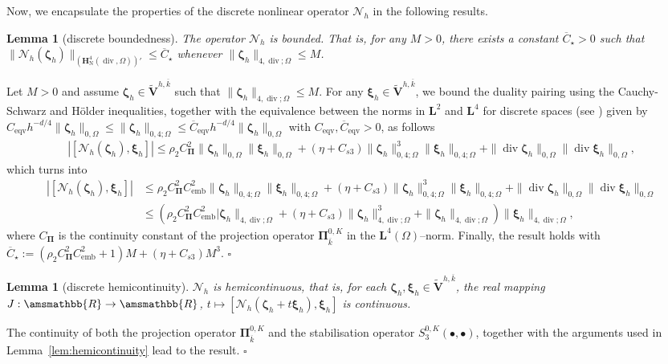 \documentclass[fleqn,a4paper]{cas-sc}
\newcommand\vdiv{\mathop{\mathrm{div}}\nolimits}
\newcommand{\bbR}{\amsmathbb{R}}
\newcommand{\bxi}{\boldsymbol{\xi}}
\newcommand{\bzeta}{\boldsymbol{\zeta}}
\newcommand{\bPi}{\boldsymbol{\Pi}}
\newcommand{\0}{\boldsymbol{0}}
\newcommand\cN{\mathcal{N}}
\newcommand\bV{\mathbf{V}}
\newcommand\bH{\mathbf{H}}
\newcommand\bL{\mathbf{L}}
\numberwithin{equation}{section}
\numberwithin{figure}{section}
\newtheorem{lemma}[theorem]{Lemma}
\newenvironment{proof}{\noindent{\it Proof.}}{\hfill$\square$}
\begin{document}
{Now, we encapsulate the properties of the discrete nonlinear operator $\cN_h$ in the following results.
\begin{lemma}[discrete boundedness]\label{lem:boundedness_h}
    The operator $\cN_h$ is bounded. That is, for any $M > 0$, there exists a constant $\overline{C}_\star> 0$ such that $\|\cN_h(\bzeta_h)\|_{(\bH^4_{\mathrm{N}}(\vdiv,\Omega))'} \le \overline{C}_\star$ whenever $\|\bzeta_h\|_{{{4,\vdiv;\Omega}}} \le M$.
\end{lemma}
\begin{proof}
    Let $M > 0$ and assume $\bzeta_h \in\widetilde{\bV}^{h,\overline{k}}$ such that $\|\bzeta_h\|_{{4,\vdiv;\Omega}} \le M$. For any $\bxi_h \in \widetilde{\bV}^{h,\overline{k}}$, we bound the duality pairing using the Cauchy-Schwarz and Hölder inequalities, together with the equivalence between the norms in $\bL^2$ and $\bL^4$ for discrete spaces (see \cite[Lemma 12.1]{ErnGuermond2021FE1}) given by $C_{\text{eqv}}h^{-d/4}\|\bzeta_h\|_{0,\Omega} \le \|\bzeta_h\|_{0,4;\Omega}\le \overline{C}_{\text{eqv}}h^{-d/4}\|\bzeta_h\|_{0,\Omega}$ with $C_{\text{eqv}},\overline{C}_{\text{eqv}}>0$, as follows
    \begin{align*}
        |[\cN_h(\bzeta_h), \bxi_h]|
        \le \rho_2C_{\bPi}^2 \|\bzeta_h\|_{0, \Omega} \|\bxi_h\|_{0, \Omega} + (\eta+C_{s3}) \|\bzeta_h\|_{0,4;\Omega}^3 \|\bxi_h\|_{0,4;\Omega} + \|\vdiv \bzeta_h\|_{0,\Omega} \|\vdiv \bxi_h\|_{0,\Omega},
    \end{align*}
    which turns into
    \begin{align*}
        |[\cN_h(\bzeta_h), \bxi_h]| &\le \rho_2C_{\bPi}^2C_{\text{emb}}^2 \|\bzeta_h\|_{0,4;\Omega} \|\bxi_h\|_{0,4;\Omega} + (\eta+C_{s3}) \|\bzeta_h\|_{0,4;\Omega}^3 \|\bxi_h\|_{0,4;\Omega} + \|\vdiv \bzeta_h\|_{0,\Omega} \|\vdiv \bxi_h\|_{0,\Omega} \\
        &\le \left( \rho_2C_{\bPi}^2C_{\text{emb}}^2|\bzeta_h\|_{{4,\vdiv;\Omega}} + (\eta+C_{s3})  \|\bzeta_h\|_{{4,\vdiv;\Omega}}^3 + \|\bzeta_h\|_{{4,\vdiv;\Omega}} \right) \|\bxi_h\|_{{4,\vdiv;\Omega}},
    \end{align*}
    where $C_{\bPi}$ is the continuity constant of the projection operator $\bPi_{\overline{k}}^{0,K}$ in the $\bL^4(\Omega)$--norm. Finally, the result holds with 
    $\overline{C}_\star:=\left(\rho_2C_{\bPi}^2C_{\text{emb}}^2 + 1\right) M + (\eta+C_{s3})  M^3$.
\end{proof}}
{\begin{lemma}[discrete hemicontinuity]\label{lem:hemicontinuity_h} $\cN_h$ is hemicontinuous, that is, for each $ \bzeta_h, \bxi_h \in \widetilde{\bV}^{h,\overline{k}}$, the real mapping $J:\bbR \to \bbR $, $t \mapsto [\cN_h(\bzeta_h + t\bxi_h), \bxi_h]$ is continuous.
\end{lemma}
\begin{proof}
    The continuity of both the projection operator $\bPi_{\overline{k}}^{0,K}$ and the stabilisation operator $S_3^{0,K}(\bullet,\bullet)$, together with the arguments used in Lemma~\ref{lem:hemicontinuity} lead to the result.
\end{proof}}
\end{document}
